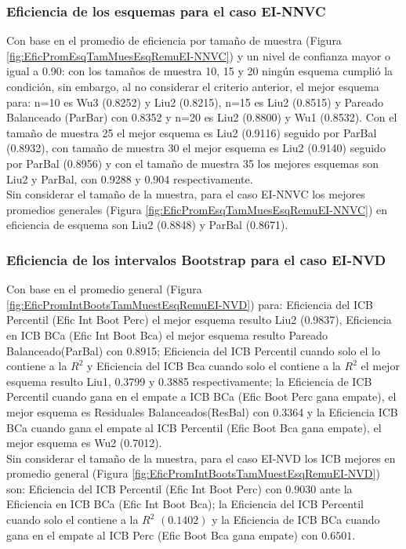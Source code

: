 \subsubsection{Eficiencia de los esquemas para el caso EI-NNVC}
Con base en el promedio de eficiencia por tamaño de muestra (Figura \ref{fig:EficPromEsqTamMuesEsqRemuEI-NNVC})  y un nivel de confianza mayor o igual a 0.90: con los tamaños de muestra 10, 15 y 20 ningún esquema cumplió la condición, sin embargo, al no considerar el criterio anterior, el mejor esquema para: n=10 es Wu3 (0.8252) y Liu2 (0.8215), n=15 es Liu2 (0.8515) y Pareado Balanceado (ParBar) con 0.8352 y n=20 es Liu2 (0.8800) y Wu1 (0.8532). Con el tamaño de muestra 25 el mejor esquema es Liu2 (0.9116) seguido por ParBal (0.8932), con tamaño de muestra 30 el mejor esquema es Liu2 (0.9140) seguido por ParBal (0.8956) y con el tamaño de muestra 35 los mejores esquemas son Liu2 y ParBal, con 0.9288 y 0.904 respectivamente.\\

Sin considerar el tamaño de la muestra, para el caso EI-NNVC los mejores promedios generales (Figura \ref{fig:EficPromEsqTamMuesEsqRemuEI-NNVC})  en eficiencia de esquema son Liu2 (0.8848) y ParBal (0.8671).




\subsubsection{Eficiencia de los intervalos Bootstrap para el caso EI-NVD}
Con base en el promedio general  (Figura \ref{fig:EficPromIntBootsTamMuestEsqRemuEI-NVD}) para: Eficiencia del ICB Percentil (Efic Int Boot Perc) el mejor esquema resulto Liu2 (0.9837), Eficiencia en ICB BCa (Efic Int Boot Bca) el mejor esquema resulto Pareado Balanceado(ParBal) con 0.8915; Eficiencia del ICB Percentil cuando solo el lo contiene a la $R^{2}$ y Eficiencia del ICB Bca cuando solo el contiene a la $R^{2}$ el mejor esquema resulto Liu1, 0.3799 y 0.3885 respectivamente; la Eficiencia de ICB Percentil cuando gana en el empate a ICB BCa (Efic Boot Perc gana empate), el mejor esquema es Residuales Balanceados(ResBal) con 0.3364 y la Eficiencia ICB BCa cuando gana el empate al ICB Percentil (Efic Boot Bca gana empate), el mejor esquema es Wu2 (0.7012).\\


Sin considerar el tamaño de la muestra, para el caso EI-NVD los ICB mejores en promedio general  (Figura \ref{fig:EficPromIntBootsTamMuestEsqRemuEI-NVD}) son: Eficiencia del ICB Percentil (Efic Int Boot Perc) con $0.9030$ ante la Eficiencia en ICB BCa (Efic Int Boot Bca); la Eficiencia del ICB Percentil cuando solo el contiene a la $R^{2}$ $(0.1402)$ y la Eficiencia de ICB BCa cuando gana en el empate al ICB Perc (Efic Boot Bca gana empate) con $0.6501$.



